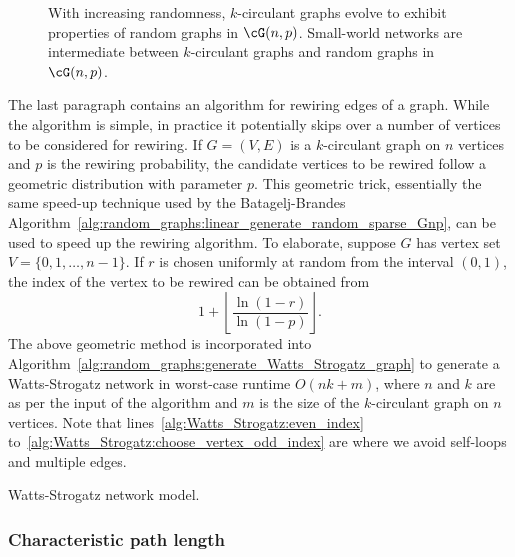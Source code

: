 \begin{figure}[!htbp]
\centering

\caption{With increasing randomness, $k$-circulant graphs evolve to
  exhibit properties of random graphs in $\cG(n,p)$. Small-world
  networks are intermediate between $k$-circulant graphs and random
  graphs in $\cG(n,p)$.}
\label{fig:random_graphs:k_circulant_small_world_random}
\end{figure}

The last paragraph contains an algorithm for rewiring edges of a
graph. While the algorithm is simple, in practice it potentially skips
over a number of vertices to be considered for rewiring. If
$G = (V,E)$ is a $k$-circulant graph on $n$ vertices and $p$ is the
rewiring probability, the candidate vertices to be rewired follow a
geometric distribution with parameter $p$. This geometric trick,
essentially the same speed-up technique used by the Batagelj-Brandes
Algorithm~\ref{alg:random_graphs:linear_generate_random_sparse_Gnp},
can be used to speed up the rewiring algorithm. To elaborate, suppose
$G$ has vertex set $V = \{0, 1, \dots, n-1\}$. If $r$ is chosen
uniformly at random from the interval $(0,1)$, the index of the vertex
to be rewired can be obtained from
\[
1 + \left\lfloor \frac{\ln(1 - r)} {\ln(1 - p)} \right\rfloor.
\]
The above geometric method is incorporated into
Algorithm~\ref{alg:random_graphs:generate_Watts_Strogatz_graph} to
generate a Watts-Strogatz network in worst-case runtime
$O(nk + m)$, where $n$ and $k$ are as per the input of the algorithm
and $m$ is the size of the $k$-circulant graph on $n$ vertices. Note
that lines~\ref{alg:Watts_Strogatz:even_index}
to~\ref{alg:Watts_Strogatz:choose_vertex_odd_index} are where we avoid
self-loops and multiple edges.

\begin{algorithm}[!htbp]

\caption{Watts-Strogatz network model.}
\label{alg:random_graphs:generate_Watts_Strogatz_graph}
\end{algorithm}



\subsubsection{Characteristic path length}

